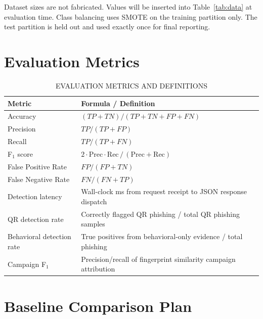\documentclass[conference]{IEEEtran}
\begin{document}
Dataset sizes are not fabricated.
Values will be inserted into Table~\ref{tab:data} at evaluation time.
Class balancing uses SMOTE on the training partition only.
The test partition is held out and used exactly once for final reporting.

\section{Evaluation Metrics}

\begin{table}[!t]
\caption{EVALUATION METRICS AND DEFINITIONS}
\label{tab:metrics}
\centering
\scriptsize
\setlength{\tabcolsep}{3pt}
\begin{tabularx}{\columnwidth}{|>{\raggedright\arraybackslash}p{}|>{\raggedright\arraybackslash}X|}
\hline
\textbf{Metric} & \textbf{Formula / Definition} \\ \hline
Accuracy        & $(TP+TN)/(TP+TN+FP+FN)$ \\ \hline
Precision       & $TP/(TP+FP)$ \\ \hline
Recall          & $TP/(TP+FN)$ \\ \hline
F$_1$ score     & $2\cdot\mathrm{Prec}\cdot\mathrm{Rec}\,/\,(\mathrm{Prec}+\mathrm{Rec})$ \\ \hline
False Positive Rate & $FP/(FP+TN)$ \\ \hline
False Negative Rate & $FN/(FN+TP)$ \\ \hline
Detection latency & Wall-clock ms from request receipt to JSON response dispatch \\ \hline
QR detection rate & Correctly flagged QR phishing / total QR phishing samples \\ \hline
Behavioral detection rate & True positives from behavioral-only evidence / total phishing \\ \hline
Campaign F$_1$  & Precision/recall of fingerprint similarity campaign attribution \\ \hline
\end{tabularx}
\end{table}

\section{Baseline Comparison Plan}
\end{document}
